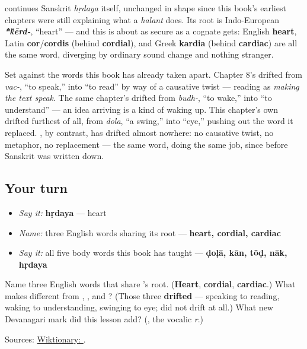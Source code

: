 \begin{cousinweb}
\textbf{} continues Sanskrit \textbf{} \emph{hṛdaya} itself, unchanged in shape since this book's earliest chapters were still explaining what a \emph{halant} does. Its root is Indo-European \emph{\textbf{*\'{k}ērd-}}, \textquotedblleft{}heart\textquotedblright{} — and this is about as secure as a cognate gets: English \textbf{heart}, Latin \textbf{cor}/\textbf{cordis} (behind \textbf{cordial}), and Greek \textbf{kardia} (behind \textbf{cardiac}) are all the same word, diverging by ordinary sound change and nothing stranger.
\end{cousinweb}

\begin{culture}
Set \textbf{} against the words this book has already taken apart. Chapter 8's \textbf{} drifted from \emph{vac-}, \textquotedblleft{}to speak,\textquotedblright{} into \textquotedblleft{}to read\textquotedblright{} by way of a causative twist — reading as \emph{making the text speak}. The same chapter's \textbf{} drifted from \emph{budh-}, \textquotedblleft{}to wake,\textquotedblright{} into \textquotedblleft{}to understand\textquotedblright{} — an idea arriving is a kind of waking up. This chapter's own \textbf{} drifted furthest of all, from \emph{dola}, \textquotedblleft{}a swing,\textquotedblright{} into \textquotedblleft{}eye,\textquotedblright{} pushing out the word it replaced. \textbf{}, by contrast, has drifted almost nowhere: no causative twist, no metaphor, no replacement — the same word, doing the same job, since before Sanskrit was written down.
\end{culture}

\subsection*{Your turn}
\begin{itemize}
\raggedright
  \item \emph{Say it:} \textbf{hṛdaya} — heart
  \item \emph{Name:} three English words sharing its root — \textbf{heart, cordial, cardiac}
  \item \emph{Say it:} all five body words this book has taught — \textbf{ḍoḷā, kān, tõḍ, nāk, hṛdaya}
\end{itemize}

\begin{tcolorbox}[breakable,colback=teal!4,colframe=teal!35!black,title={Before you move on}]
Name three English words that share \textbf{}'s root. (\textbf{Heart}, \textbf{cordial}, \textbf{cardiac}.) What makes \textbf{} different from \textbf{}, \textbf{}, and \textbf{}? (Those three \textbf{drifted} — speaking to reading, waking to understanding, swinging to eye; \textbf{} did not drift at all.) What new Devanagari mark did this lesson add? (\textbf{}, the vocalic \emph{r}.)

Sources: \href{https://en.wiktionary.org/wiki/\%E0\%A4\%B9\%E0\%A5\%83\%E0\%A4\%A6\%E0\%A4\%AF}{Wiktionary: }.
\end{tcolorbox}
